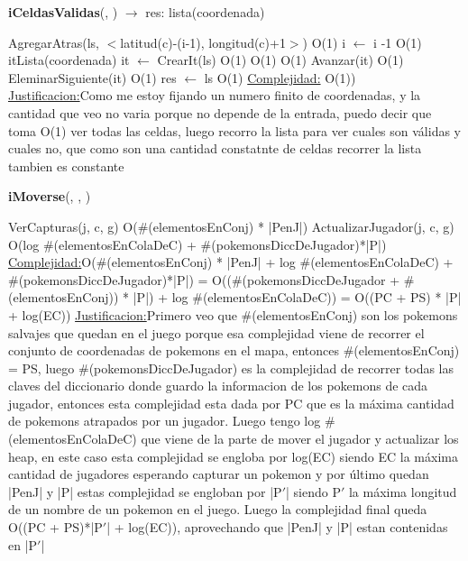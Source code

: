 \begin{Algoritmos}
\begin{algorithm}[H]{\textbf{iCeldasValidas}(, ) $\to$ res: lista(coordenada)}
\begin{algorithmic}[1]
\begin{scriptsize}
			\EndIf			
				\State AgregarAtras(ls, $<$latitud(c)-(i-1), longitud(c)+1$>$) \Comment O(1)
			\EndIf			
			\State i $\gets$ i -1 \Comment O(1) 
		\EndWhile
		\State itLista(coordenada) it $\gets$ CrearIt(ls) \Comment O(1)		
		 \Comment O(1)
			 \Comment O(1)
				\State Avanzar(it) \Comment O(1) 
			\Else
				\State EleminarSiguiente(it) \Comment O(1)			
			\EndIf
		\EndWhile
		\State res $\gets$ ls \Comment O(1)
		\If{} \EndIf
		\medskip
		\Statex \underline{Complejidad:} O(1))
		\Statex \underline{Justificacion:}Como me estoy fijando un numero finito de coordenadas, y la cantidad que veo no varia porque no depende de la entrada, puedo decir que toma O(1) ver todas las celdas, luego recorro la lista para ver cuales son válidas y cuales no, que como son una cantidad constatnte de celdas recorrer la lista tambien es constante
		\end{scriptsize}
	\end{algorithmic}
\end{algorithm}

\begin{algorithm}[H]{\textbf{iMoverse}(, , )}
	\begin{algorithmic}[1]
		\State VerCapturas(j, c, g) \Comment O($\#$(elementosEnConj) * |PenJ|)
		\State ActualizarJugador(j, c, g) \Comment O(log $\#$(elementosEnColaDeC) +  $\#$(pokemonsDiccDeJugador)*|P|)
		\medskip
		\Statex \underline{Complejidad:}O($\#$(elementosEnConj) * |PenJ| + log $\#$(elementosEnColaDeC) + $\#$(pokemonsDiccDeJugador)*|P|) = O(($\#$(pokemonsDiccDeJugador + $\#$(elementosEnConj)) * |P|) + log $\#$(elementosEnColaDeC)) = O((PC + PS) * |P| + log(EC))
		\Statex \underline{Justificacion:}Primero veo que $\#$(elementosEnConj) son los pokemons salvajes que quedan en el juego porque esa complejidad viene de recorrer el conjunto de coordenadas de pokemons en el mapa, entonces $\#$(elementosEnConj) = PS, luego $\#$(pokemonsDiccDeJugador) es la complejidad de recorrer todas las claves del diccionario donde guardo la informacion de los pokemons de cada jugador, entonces esta complejidad esta dada por PC que es la máxima cantidad de pokemons atrapados por un jugador. Luego tengo log $\#$(elementosEnColaDeC) que viene de la parte de mover el jugador y actualizar los heap, en este caso esta complejidad se engloba por log(EC) siendo EC la máxima cantidad de jugadores esperando capturar un pokemon y por último quedan |PenJ| y |P| estas complejidad se engloban por |P$'$| siendo P$'$ la máxima longitud de un nombre de un pokemon en el juego. Luego la complejidad final queda O((PC + PS)*|P$'$| + log(EC)), aprovechando que |PenJ| y |P| estan contenidas en |P$'$|   
	\end{algorithmic}
\end{algorithm}


\end{Algoritmos}

